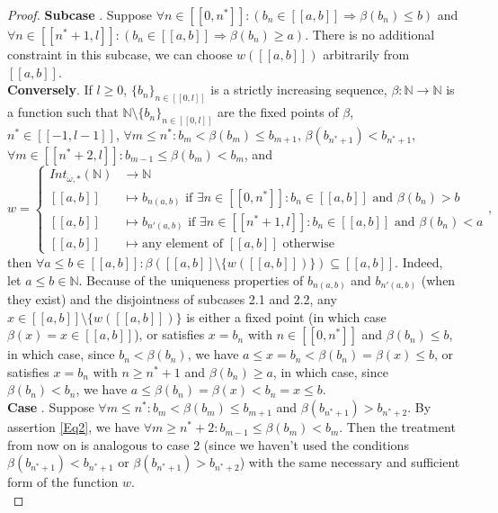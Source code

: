 \documentclass[a4paper,11pt]{article}
\newcommand*\circled[1]{\tikz[baseline=(char.base)]{
            \node[shape=circle,draw,inner sep=2pt] (char) {#1};}}
\theoremstyle{plain}
\theoremstyle{definition}
\theoremstyle{remark}
\begin{document}
\begin{proof}
\textbf{Subcase \circled{2.3}}. Suppose $\forall n \in [\![0,n^*]\!] : (b_n \in [\![a,b]\!] \Rightarrow \beta(b_n) \leq b)$ and ${\forall n \in [\![n^*+1,l]\!] : (b_n \in [\![a,b]\!] \Rightarrow \beta(b_n) \geq a)}$. There is no additional constraint in this subcase, we can choose $w([\![a,b]\!])$ arbitrarily from $[\![a,b]\!]$. \\
\textbf{Conversely}. If $l \geq 0$, $\{b_n\}_{n \in [\![0,l]\!]}$ is a strictly increasing sequence, $\beta : \mathbb{N} \to \mathbb{N}$ is a function such that $\mathbb{N} \setminus \{b_n\}_{n \in [\![0,l]\!]}$ are the fixed points of $\beta$, $n^* \in [\![-1,l-1]\!]$, $\forall m \leq n^* : b_m < \beta(b_m) \leq b_{m+1}$, $\beta(b_{n^*+1}) < b_{n^*+1}$, $\forall m \in [\![n^*+2,l]\!] : b_{m-1} \leq \beta(b_m) < b_m$, and 
\[ w = \begin{cases} Int_{\omega,*}(\mathbb{N}) &\to \mathbb{N} \\ [\![a,b]\!] &\mapsto b_{n(a,b)} \text { if } \exists n \in [\![0,n^*]\!] : b_n \in [\![a,b]\!] \text{ and } \beta(b_n) > b \\ [\![a,b]\!] &\mapsto b_{n'(a,b)} \text { if } \exists n \in [\![n^*+1,l]\!] : b_n \in [\![a,b]\!] \text{ and } \beta(b_n) < a \\ [\![a,b]\!] &\mapsto \text{any element of } [\![a,b]\!] \text{ otherwise} \end{cases}, \]
then $\forall a \leq b \in [\![a,b]\!] : \beta([\![a,b]\!] \setminus \{w([\![a,b]\!])\}) \subseteq [\![a,b]\!]$. Indeed, let $a \leq b \in \mathbb{N}$. Because of the uniqueness properties of $b_{n(a,b)}$ and $b_{n'(a,b)}$ (when they exist) and the disjointness of subcases 2.1 and 2.2, any $x \in [\![a,b]\!] \setminus \{w([\![a,b]\!])\}$ is either a fixed point (in which case $\beta(x) = x \in [\![a,b]\!]$), or satisfies $x = b_n$ with $n \in [\![0,n^*]\!]$ and $\beta(b_n) \leq b$, in which case, since $b_n < \beta(b_n)$, we have $a \leq x =  b_n < \beta(b_n) = \beta(x) \leq b$, or satisfies $x = b_n$ with $n \geq n^* + 1$ and $\beta(b_n) \geq a$, in which case, since $\beta(b_n) < b_n$, we have $a \leq \beta(b_n) = \beta(x) < b_n = x \leq b$.  \\
\textbf{Case \circled{3}}.  Suppose $\forall m \leq n^* : b_m < \beta(b_m) \leq b_{m+1}$ and $\beta(b_{n^*+1}) > b_{n^*+2}$. By assertion \ref{Eq2}, we have $\forall m \geq n^* + 2 : b_{m-1} \leq \beta(b_m) < b_m$. Then the treatment from now on is analogous to case 2 (since we haven't used the conditions $\beta(b_{n^*+1}) < b_{n^*+1}$ or $\beta(b_{n^*+1}) > b_{n^*+2}$) with the same necessary and sufficient form of the function $w$.\\
\end{proof}
\end{document}
